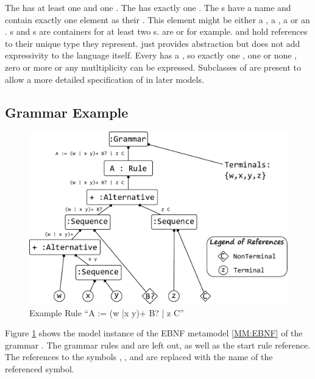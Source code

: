 The  has at least one  and one . The  has exactly one . The s have a name and contain exactly one element as their . This element might be either a , a , a  or an . s and s are containers for at least two s.  are  or  for example.  and  hold references to their unique type they represent.  just provides abstraction but does not add expressivity to the language itself. Every  has a , so exactly one , one or none , zero or more \code{+} or any mutltiplicity \code{*} can be expressed. Subclasses of  are present to allow a more detailed specification of  in later models.



\subsection{Grammar Example}
\begin{figure}
\centering
\includegraphics[scale=0.7]{gfx/ex/grammarExample} 
\caption{Example Rule ``A := (w |x y)+ B? | z C''}
\label{MM:GrammarExample}
\end{figure}
Figure \ref{MM:GrammarExample} shows the model instance of the EBNF metamodel \ref{MM:EBNF} of the grammar  . The grammar rules  and  are left out, as well as the start rule reference. The references to the symbols , ,  and  are replaced with the name of the referenced symbol.

